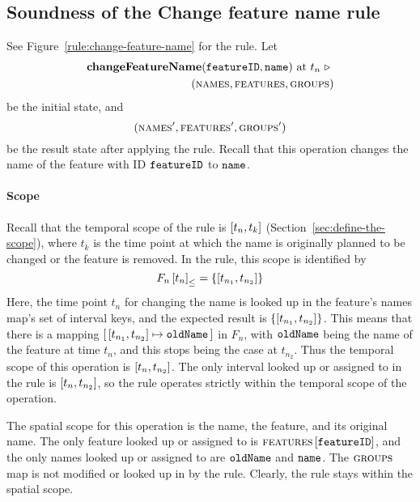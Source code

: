 \subsection{Soundness of the Change feature name rule} 
\label{sub:soundness-of-the-change-feature-name-rule}

See Figure~\vref{rule:change-feature-name} for the  rule. Let 
\begin{equation*}
   \begin{split}
      \textbf{changeFeatureName}(\texttt{featureID}, \texttt{name}) \text{ at } t_n \ \triangleright \  \\
      (\textsc{names}, \textsc{features}, \textsc{groups}{})
   \end{split}
\end{equation*}
be the initial state, and
\[
   (\textsc{names}', \textsc{features}', \textsc{groups}{}')
\]
be the result state after applying the  rule. Recall that this operation changes the name of the feature with ID $\texttt{featureID}$ to $\texttt{name}$.

\paragraph{Scope}
Recall that the temporal scope of the  rule is $\interval{t_n}{t_k}$ (Section~\vref{sec:define-the-scope}), where $t_k$ is the time point at which the name is originally planned to be changed or the feature is removed. In the rule, this scope is identified by 
   \[
      \containing{F_n}{t_n} = \set{\interval{t_{n_1}}{t_{n_2}}}
   \]
   Here, the time point $t_n$ for changing the name is looked up in the feature's names map's set of interval keys, and the expected result is $\set{\interval{t_{n_1}}{t_{n_2}}}$. This means that there is a mapping $\intervalmapping{t_{n_1}}{t_{n_2}}{\var{oldName}}$ in $F_n$, with $\texttt{oldName}$ being the name of the feature at time $t_n$, and this stops being the case at $t_{n_2}$. Thus the temporal scope of this operation is $\interval{t_n}{t_{n_2}}$. The only interval looked up or assigned to in the rule is $\interval{t_n}{t_{n_2}}$, so the rule operates strictly within the temporal scope of the operation.

   The spatial scope for this operation is the name, the feature, and its original name. The only feature looked up or assigned to is $\textsc{features} \left[ \texttt{featureID} \right]$, and the only names looked up or assigned to are $\texttt{oldName}$ and $\texttt{name}$. The $\textsc{groups}{}{}$ map is not modified or looked up in by the rule. Clearly, the rule stays within the spatial scope.
\\

